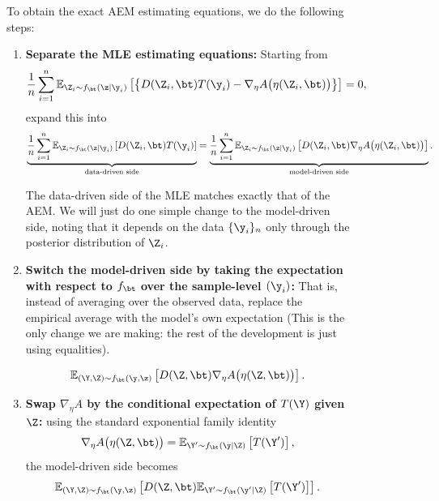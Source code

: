 \begin{figure}
\begin{tcolorbox}[colback=green!3!white, colframe=green!50!black, title=From the estimating equations of MLE to those of AEM]
To obtain the exact AEM estimating equations, we do the following steps:
\begin{enumerate}
    \item \textbf{Separate the MLE estimating equations:} Starting from
    \[
    \frac{1}{n} \sum_{i=1}^n 
    \mathbb{E}_{\Z_i \sim f_\bt(\z \mid \y_i)}
    \left[
        \left\{
            D(\Z_i, \bt)
            T(\y_i) - \nabla_\eta A\bigl( \eta(\Z_i, \bt) \bigr)
        \right\}
    \right]
    = 0,
    \]
    expand this into
    \[
    \underbrace{
    \frac{1}{n} \sum_{i=1}^n 
    \mathbb{E}_{\Z_i \sim f_\bt(\z \mid \y_i)}
    \left[
        D(\Z_i, \bt)
        T(\y_i)
    \right]
    }_{\text{data-driven side}}
    =
    \underbrace{
    \frac{1}{n} \sum_{i=1}^n 
    \mathbb{E}_{\Z_i \sim f_\bt(\z \mid \y_i)}
    \left[
        D(\Z_i, \bt)
        \nabla_\eta A\bigl(\eta(\Z_i, \bt)\bigr)
    \right]
    }_{\text{model-driven side}}.
    \]

    The data-driven side of the MLE matches exactly that of the AEM. We will just do one simple change to the model-driven side, noting that it depends on the data $\{\y_i\}_n$ only through the posterior distribution of $\Z_i$.
    
    \item \textbf{Switch the model-driven side by taking the expectation with respect to $f_\bt$ over the sample-level $(\y_i)$:} That is, instead of averaging over the observed data, replace the empirical average with the model's own expectation ({\color{red}This is the only change we are making}: the rest of the development is just using equalities).
    
    \[
    \mathbb{E}_{(\Y, \Z) \sim f_\bt(\y, \z)}
    \left[
        D(\Z, \bt)
        \nabla_\eta A\bigl(\eta(\Z, \bt)\bigr)
    \right].
    \]
    
    \item \textbf{Swap $\nabla_\eta A$ by the conditional expectation of $T(\Y)$ given $\Z$:} using the standard exponential family identity
    \[
    \nabla_\eta A\bigl(\eta(\Z, \bt)\bigr)
    = \mathbb{E}_{\Y' \sim f_\bt(\y \mid \Z)} \left[ T(\Y') \right],
    \]
    the model-driven side becomes
    \[
    \mathbb{E}_{(\Y, \Z) \sim f_\bt(\y, \z)}
    \left[
        D(\Z, \bt)
        \mathbb{E}_{\Y' \sim f_\bt(\y' \mid \Z)}
        \left[
            T(\Y')
        \right]
    \right].
    \]


\end{enumerate}
\end{tcolorbox}
\end{figure}

